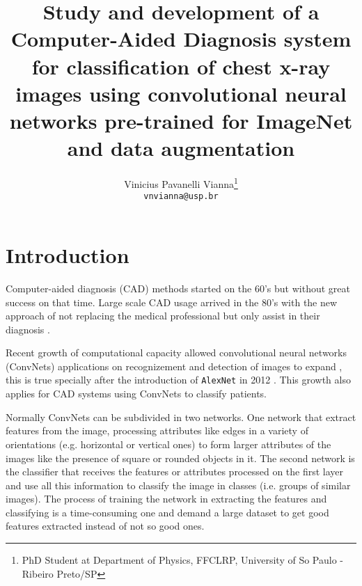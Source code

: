 \documentclass[twocolumn]{article}
\title{Study and development of a Computer-Aided Diagnosis system for classification of chest x-ray images using convolutional neural networks pre-trained for ImageNet and data augmentation}
\author{Vinicius Pavanelli Vianna\thanks{PhD Student at Department of Physics, FFCLRP, University of So Paulo - Ribeiro Preto/SP}\\
\texttt{vnvianna@usp.br}}
\newcommand{\mycite}{\cite}
\begin{document}
{}
\saythanks
\section{Introduction}
Computer-aided diagnosis (CAD) methods started on the 60's\mycite{CAD_1960} but without great success on that time. Large scale CAD usage arrived in the 80's with the new approach of not replacing the medical professional but only assist in their diagnosis \mycite{CAD_review}.

Recent growth of computational capacity allowed convolutional neural networks (ConvNets) applications on recognizement and detection of images to expand \mycite{Lecun_2015}, this is true specially after the introduction of \texttt{AlexNet} in 2012 \mycite{ImageNet}. This growth also applies for CAD systems using ConvNets to classify patients.

Normally ConvNets can be subdivided in two networks. One network that extract features from the image, processing attributes like edges in a variety of orientations (e.g. horizontal or vertical ones) to form larger attributes of the images like the presence of square or rounded objects in it. The second network is the classifier that receives the features or attributes processed on the first layer and use all this information to classify the image in classes (i.e. groups of similar images). The process of training the network in extracting the features and classifying is a time-consuming one and demand a large dataset to get good features extracted instead of not so good ones.
\end{document}
